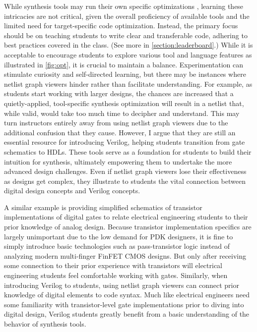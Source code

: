 While synthesis tools may run their own specific optimizations \cite{1364.1-2005}, learning these intricacies are not critical, given the overall proficiency of available tools and the limited need for target-specific code optimization. Instead, the primary focus should be on teaching students to write clear and transferable code, adhering to best practices covered in the class. (See more in \autoref{section:leaderboard}.) While it is acceptable to encourage students to explore various tool and language features as illustrated in \autoref{fig:opt}, it is crucial to maintain a balance. Experimentation can stimulate curiosity and self-directed learning, but there may be instances where netlist graph viewers hinder rather than facilitate understanding. For example, as students start working with larger designs, the chances are increased that a quietly-applied, tool-specific synthesis optimization will result in a netlist that, while valid, would take too much time to decipher and understand. This may turn instructors entirely away from using netlist graph viewers due to the additional confusion that they cause. However, I argue that they are still an essential resource for introducing Verilog, helping students transition from gate schematics to HDLs. These tools serve as a foundation for students to build their intuition for synthesis, ultimately empowering them to undertake the more advanced design challenges. Even if netlist graph viewers lose their effectiveness as designs get complex, they illustrate to students the vital connection between digital design concepts and Verilog concepts.

A similar example is providing simplified schematics of transistor implementations of digital gates to relate electrical engineering students to their prior knowledge of analog design. Because transistor implementation specifics are largely unimportant due to the low demand for PDK designers, it is fine to simply introduce basic technologies such as pass-transistor logic instead of analyzing modern multi-finger FinFET CMOS designs. But only after receiving some connection to their prior experience with transistors will electrical engineering students feel comfortable working with gates. Similarly, when introducing Verilog to students, using netlist graph viewers can connect prior knowledge of digital elements to code syntax. Much like electrical engineers need some familiarity with transistor-level gate implementations prior to diving into digital design, Verilog students greatly benefit from a basic understanding of the behavior of synthesis tools.

